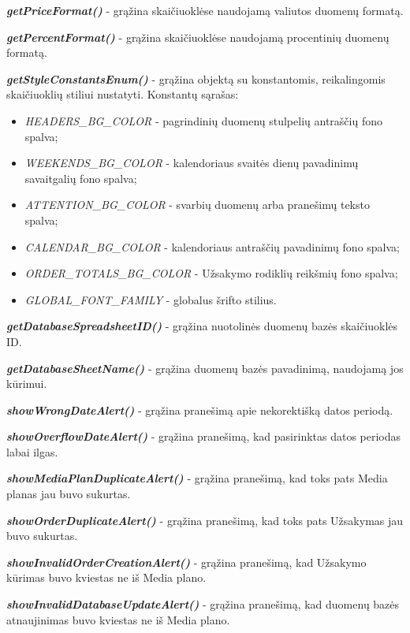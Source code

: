\textit{\textbf{getPriceFormat()}} - grąžina skaičiuoklėse naudojamą valiutos duomenų formatą. 

\textit{\textbf{getPercentFormat()}} - grąžina skaičiuoklėse naudojamą procentinių duomenų formatą. 

\textit{\textbf{getStyleConstantsEnum()}} - grąžina objektą su konstantomis, reikalingomis skaičiuoklių stiliui nustatyti. Konstantų sąrašas:
\begin{itemize}
    \itemsep0em 
    \item \textit{HEADERS\_BG\_COLOR} - pagrindinių duomenų stulpelių antraščių fono spalva;
    \item \textit{WEEKENDS\_BG\_COLOR} - kalendoriaus svaitės dienų pavadinimų savaitgalių fono spalva;
    \item \textit{ATTENTION\_BG\_COLOR} - svarbių duomenų arba pranešimų teksto spalva;
    \item \textit{CALENDAR\_BG\_COLOR} - kalendoriaus antraščių pavadinimų fono spalva;
    \item \textit{ORDER\_TOTALS\_BG\_COLOR} - Užsakymo rodiklių reikšmių fono spalva;
    \item \textit{GLOBAL\_FONT\_FAMILY} - globalus šrifto stilius.
\end{itemize} 

\textit{\textbf{getDatabaseSpreadsheetID()}} - grąžina nuotolinės duomenų bazės skaičiuoklės ID. 

\textit{\textbf{getDatabaseSheetName()}} - grąžina duomenų bazės pavadinimą, naudojamą jos kūrimui. 

\textit{\textbf{showWrongDateAlert()}} - grąžina pranešimą apie nekorektišką datos periodą. 

\textit{\textbf{showOverflowDateAlert()}} - grąžina pranešimą, kad pasirinktas datos periodas labai ilgas. 

\textit{\textbf{showMediaPlanDuplicateAlert()}} - grąžina pranešimą, kad toks pats Media planas jau buvo sukurtas. 

\textit{\textbf{showOrderDuplicateAlert()}} - grąžina pranešimą, kad toks pats Užsakymas jau buvo sukurtas. 

\textit{\textbf{showInvalidOrderCreationAlert()}} - grąžina pranešimą, kad Užsakymo kūrimas buvo kviestas ne iš Media plano.  

\textit{\textbf{showInvalidDatabaseUpdateAlert()}} - grąžina pranešimą, kad duomenų bazės atnaujinimas buvo kviestas ne iš Media plano. 





